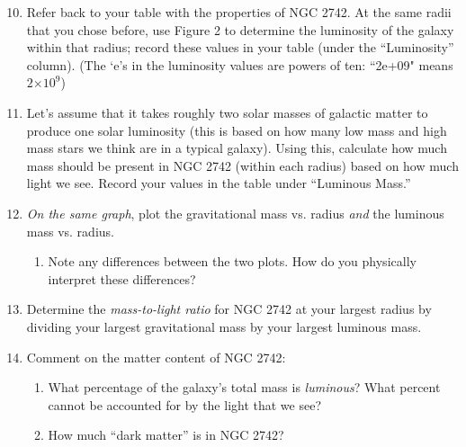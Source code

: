 \documentclass[11pt]{article}%
\providecommand{\e}[1]{\ensuremath{\times 10^{#1}}} %
\begin{document}
\begin{enumerate}
\setcounter{enumi}{9}

\item Refer back to your table with the properties of NGC 2742. At the same radii that you chose before, use Figure 2 to determine the luminosity of the galaxy within that radius; record these values in your table (under the ``Luminosity'' column). (The `e's in the luminosity values are powers of ten: ``2e+09" means $2 \e{9}$)

\item Let's assume that it takes roughly two solar masses of galactic matter to produce one solar luminosity (this is based on how many low mass and high mass stars we think are in a typical galaxy). Using this, calculate how much mass should be present in NGC 2742 (within each radius) based on how much light we see. Record your values in the table under ``Luminous Mass.'' 

\item \emph{On the same graph}, plot the gravitational mass vs. radius \emph{and} the luminous mass vs. radius.
    \begin{enumerate}
        \item Note any differences between the two plots. How do you physically interpret these differences?
    \end{enumerate}

\item Determine the \textit{mass-to-light ratio} for NGC 2742 at your largest radius by dividing your largest gravitational mass by your largest luminous mass. 

\item Comment on the matter content of NGC 2742:
\begin{enumerate}
    \item What percentage of the galaxy's total mass is \emph{luminous}? What percent cannot be accounted for by the light that we see?
    
    \item How much ``dark matter'' is in NGC 2742?
\end{enumerate}
 
\end{enumerate}

\end{document}
